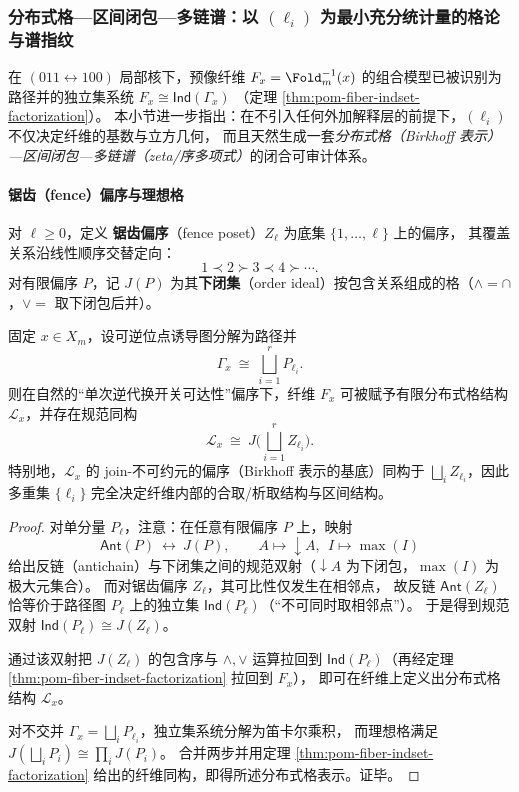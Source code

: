 \subsubsection{分布式格—区间闭包—多链谱：以 \texorpdfstring{\((\ell_i)\)}{(ℓ\_i)} 为最小充分统计量的格论与谱指纹}\label{subsubsec:pom-fiber-lattice-fence-interval-zeta}
在 \((011\leftrightarrow 100)\) 局部核下，预像纤维 \(F_x=\Fold_m^{-1}(x)\) 的组合模型已被识别为路径并的独立集系统
\(
F_x\cong \mathsf{Ind}(\Gamma_x)
\)
（定理 \ref{thm:pom-fiber-indset-factorization}）。
本小节进一步指出：在不引入任何外加解释层的前提下，\((\ell_i)\) 不仅决定纤维的基数与立方几何，
而且天然生成一套\emph{分布式格（Birkhoff 表示）—区间闭包—多链谱（zeta/序多项式）}的闭合可审计体系。

\paragraph{锯齿（fence）偏序与理想格}
\begin{definition}[锯齿偏序与理想格]\label{def:pom-fence-poset}
对 \(\ell\ge 0\)，定义 \textbf{锯齿偏序}（fence poset）\(Z_\ell\) 为底集 \(\{1,\dots,\ell\}\) 上的偏序，
其覆盖关系沿线性顺序交替定向：
\[
1\prec 2 \succ 3\prec 4 \succ \cdots.
\]
对有限偏序 \(P\)，记 \(J(P)\) 为其\textbf{下闭集}（order ideal）按包含关系组成的格（\(\wedge=\cap\)，\(\vee=\) 取下闭包后并）。
\end{definition}

\begin{theorem}\label{thm:pom-fiber-birkhoff-fence-ideal-lattice}
固定 \(x\in X_m\)，设可逆位点诱导图分解为路径并
\[
\Gamma_x\ \cong\ \bigsqcup_{i=1}^r P_{\ell_i}.
\]
则在自然的“单次逆代换开关可达性”偏序下，纤维 \(F_x\) 可被赋予有限分布式格结构 \(\mathcal L_x\)，并存在规范同构
\[
\mathcal L_x\ \cong\ J\!\Big(\bigsqcup_{i=1}^r Z_{\ell_i}\Big).
\]
特别地，\(\mathcal L_x\) 的 join-不可约元的偏序（Birkhoff 表示的基底）同构于
\(\bigsqcup_i Z_{\ell_i}\)，因此多重集 \(\{\ell_i\}\) 完全决定纤维内部的合取/析取结构与区间结构。
\end{theorem}
\begin{proof}
对单分量 \(P_\ell\)，注意：在任意有限偏序 \(P\) 上，映射
\[
\mathsf{Ant}(P)\ \longleftrightarrow\ J(P),
\qquad
A\mapsto \downarrow A,\ \ I\mapsto \max(I)
\]
给出反链（antichain）与下闭集之间的规范双射（\(\downarrow A\) 为下闭包，\(\max(I)\) 为极大元集合）。
而对锯齿偏序 \(Z_\ell\)，其可比性仅发生在相邻点，
故反链 \(\mathsf{Ant}(Z_\ell)\) 恰等价于路径图 \(P_\ell\) 上的独立集 \(\mathsf{Ind}(P_\ell)\)（“不可同时取相邻点”）。
于是得到规范双射 \(\mathsf{Ind}(P_\ell)\cong J(Z_\ell)\)。
\par
通过该双射把 \(J(Z_\ell)\) 的包含序与 \(\wedge,\vee\) 运算拉回到 \(\mathsf{Ind}(P_\ell)\)（再经定理 \ref{thm:pom-fiber-indset-factorization} 拉回到 \(F_x\)），
即可在纤维上定义出分布式格结构 \(\mathcal L_x\)。
\par
对不交并 \(\Gamma_x=\bigsqcup_i P_{\ell_i}\)，独立集系统分解为笛卡尔乘积，
而理想格满足 \(J(\bigsqcup_i P_i)\cong\prod_i J(P_i)\)。
合并两步并用定理 \ref{thm:pom-fiber-indset-factorization} 给出的纤维同构，即得所述分布式格表示。证毕。
\end{proof}

